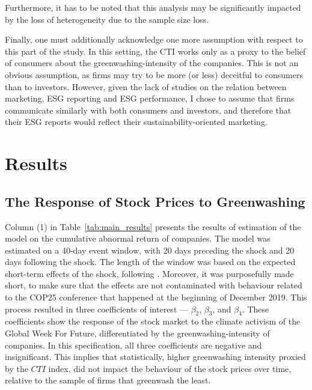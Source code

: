 \documentclass[12pt]{article}
\begin{document}
Furthermore, it has to be noted that this analysis may be significantly impacted by the loss of heterogeneity due to the sample size loss.  

Finally, one must additionally acknowledge one more assumption with respect to this part of the study. In this setting, the CTI works only as a proxy to the belief of consumers about the greenwashing-intensity of the companies. This is not an obvious assumption, as firms may try to be more (or less) deceitful to consumers than to investors. However, given the lack of studies on the relation between marketing, ESG reporting and ESG performance, I chose to assume that firms communicate similarly with both consumers and investors, and therefore that their ESG reports would reflect their sustainability-oriented marketing. 


\section{Results}\label{sect:results}


\subsection{The Response of Stock Prices to Greenwashing}

Column (1) in Table~\ref{tab:main_results} presents the results of estimation of the model on the cumulative abnormal return of companies. The model was estimated on a 40-day event window, with 20 days preceding the shock and 20 days following the shock. The length of the window was based on the expected short-term effects of the shock, following \textcite{schusterStockPriceReactions2023}. Moreover, it was purposefully made short, to make sure that the effects are not contaminated with behaviour related to the COP25 conference that happened at the beginning of December 2019. This process resulted in three coefficients of interest --- $\beta_2$, $\beta_3$, and $\beta_4$. These coefficients show the response of the stock market to the climate activism of the Global Week For Future, differentiated by the greenwashing-intensity of companies. In this specification, all three coefficients are negative and insignificant. This implies that statistically, higher greenwashing intensity proxied by the $CTI$ index, did not impact the behaviour of the stock prices over time, relative to the sample of firms that greenwash the least. 
\end{document}
